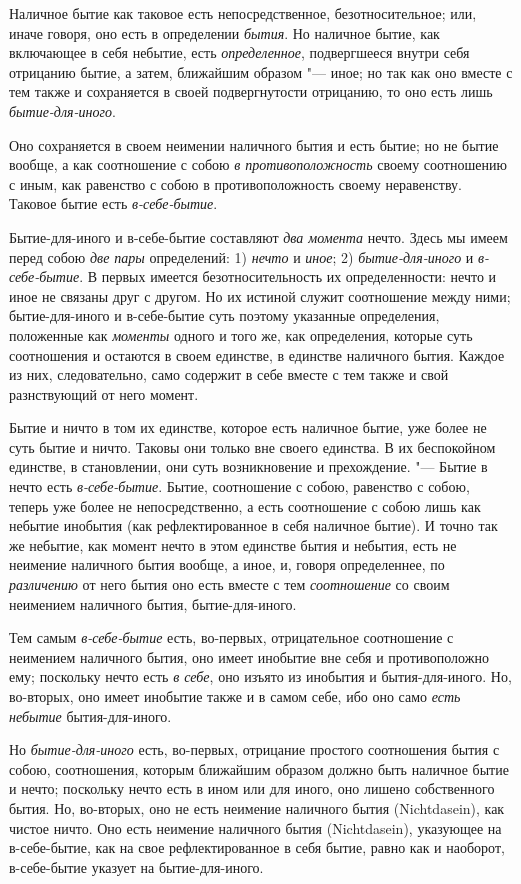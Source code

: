 Наличное бытие как таковое есть непосредственное, безотносительное; или,
иначе говоря, оно есть в определении {\em бытия}. Но
наличное бытие, как включающее в себя небытие, есть
{\em определенное}, подвергшееся внутри себя отрицанию
бытие, а затем, ближайшим образом "--- иное; но так как оно вместе с тем
также и сохраняется в своей подвергнутости отрицанию, то оно есть лишь
{\em бытие-для-иного}.

Оно сохраняется в своем неимении наличного бытия и есть бытие; но не бытие
вообще, а как соотношение с собою {\em в
противоположность} своему соотношению с иным, как равенство с собою в
противоположность своему неравенству. Таковое бытие есть
{\em в-себе-бытие}.

Бытие-для-иного и в-себе-бытие составляют {\em два
момента} нечто. Здесь мы имеем перед собою {\em две
пары} определений: 1) {\em нечто} и
{\em иное}; 2) {\em бытие-для-иного} и {\em в-себе-бытие}. В первых имеется
безотносительность их определенности: нечто и иное не связаны друг с
другом. Но их истиной служит соотношение между ними; бытие-для-иного и
в-себе-бытие суть поэтому указанные определения, положенные как
{\em моменты} одного и того же, как определения,
которые суть соотношения и остаются в своем единстве, в единстве наличного
бытия. Каждое из них, следовательно, само содержит в себе вместе с тем
также и свой разнствующий от него момент.

Бытие и ничто в том их единстве, которое есть наличное бытие, уже более не
суть бытие и ничто. Таковы они только вне своего единства. В их беспокойном
единстве, в становлении, они суть возникновение и прехождение. "--- Бытие в
нечто есть {\em в-себе-бытие}. Бытие, соотношение с
собою, равенство с собою, теперь уже более не непосредственно, а есть
соотношение с собою лишь как небытие инобытия (как рефлектированное в себя
наличное бытие). И точно так же небытие, как момент нечто в этом единстве
бытия и небытия, есть не неимение наличного бытия вообще, а иное, и,
говоря определеннее, по {\em различению} от него бытия
оно есть вместе с тем {\em соотношение} со своим
неимением наличного бытия, бытие-для-иного.

Тем самым {\em в-себе-бытие} есть, во-первых,
отрицательное соотношение с неимением наличного бытия, оно имеет инобытие
вне себя и противоположно ему; поскольку нечто есть
{\em в себе}, оно изъято из инобытия и бытия-для-иного.
Но, во-вторых, оно имеет инобытие также и в самом себе, ибо оно
само {\em есть небытие} бытия-для-иного.

Но {\em бытие-для-иного} есть, во-первых, отрицание
простого соотношения бытия с собою, соотношения, которым ближайшим образом
должно быть наличное бытие и нечто; поскольку нечто есть в ином
или для иного, оно лишено собственного бытия. Но, во-вторых,
оно не есть неимение наличного бытия (Nicht\-dasein), как чистое ничто. Оно
есть неимение наличного бытия (Nicht\-dasein), указующее на в-себе-бытие, как
на свое рефлектированное в себя бытие, равно как и наоборот, в-себе-бытие
указует на бытие-для-иного.

